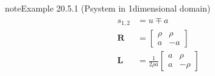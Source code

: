 \documentclass[letterpaper,10pt,english]{jupyterBook}
\begin{document}
\begin{sphinxadmonition}{note}{Example 20.5.1 (P\sphinxhyphen{}system in 1\sphinxhyphen{}dimensional domain)}
\begin{equation*}
\end{equation*}\begin{equation*}
\begin{split}\begin{aligned}
  s_{1,2} & = u \mp a \\
  \mathbf{R} & = \begin{bmatrix} \rho & \rho \\ a & -a  \end{bmatrix} \\
  \mathbf{L} & = \frac{1}{2 \rho a} \begin{bmatrix} a & \rho \\ a & -\rho  \end{bmatrix} \\
\end{aligned}\end{split}
\end{equation*}\end{sphinxadmonition}
\label{ch/pde/hyperbolic:example-5}
\end{document}

